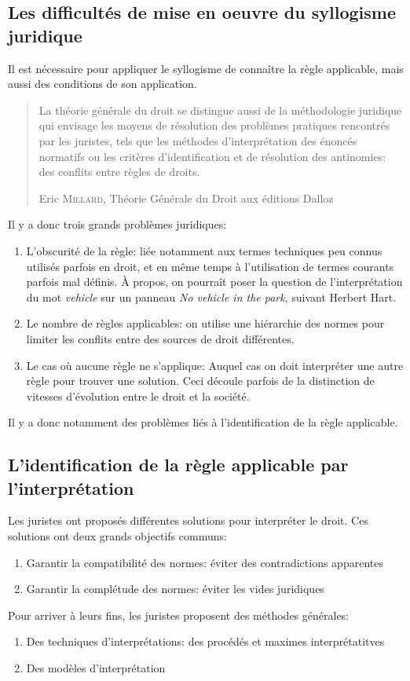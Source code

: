 \documentclass[math]{cours}
\begin{document}
\subsection{Les difficultés de mise en oeuvre du syllogisme juridique}
Il est nécessaire pour appliquer le syllogisme de connaître la règle applicable, mais aussi des conditions de son application.
\begin{quote}
	La théorie générale du droit se distingue aussi de la méthodologie juridique qui envisage les moyens de résolution des problèmes pratiques rencontrés par les juristes, tels que les méthodes d'interprétation des énoncés normatifs ou les critères d'identification et de résolution des antinomies: des conflits entre règles de droits.
	\begin{flushright}
		Eric \textsc{Millard}, Théorie Générale du Droit aux éditions Dalloz
	\end{flushright}

\end{quote}

Il y a donc trois grands problèmes juridiques:
\begin{enumerate}
	\item L'obscurité de la règle: liée notamment aux termes techniques peu connus utilisés parfois en droit, et en même temps à l'utilisation de termes courants parfois mal définis.
	      À propos, on pourraît poser la question de l'interprétation du mot \textit{vehicle} sur un panneau \textit{No vehicle in the park}, suivant Herbert Hart.
	\item Le nombre de règles applicables: on utilise une hiérarchie des normes pour limiter les conflits entre des sources de droit différentes.
	\item Le cas où aucune règle ne s'applique: Auquel cas on doit interpréter une autre règle pour trouver une solution.
	      Ceci découle parfois de la distinction de vitesses d'évolution entre le droit et la société.
\end{enumerate}
Il y a donc notamment des problèmes liés à l'identification de la règle applicable.

\subsection{L'identification de la règle applicable par l'interprétation}
Les juristes ont proposés différentes solutions pour interpréter le droit.
Ces solutions ont deux grands objectifs communs:
\begin{enumerate}
	\item Garantir la compatibilité des normes: éviter des contradictions apparentes
	\item Garantir la complétude des normes: éviter les vides juridiques
\end{enumerate}
Pour arriver à leurs fins, les juristes proposent des méthodes générales:
\begin{enumerate}
	\item Des techniques d'interprétations: des procédés et maximes interprétatitves
	\item Des modèles d'interprétation
\end{enumerate}
\end{document}
